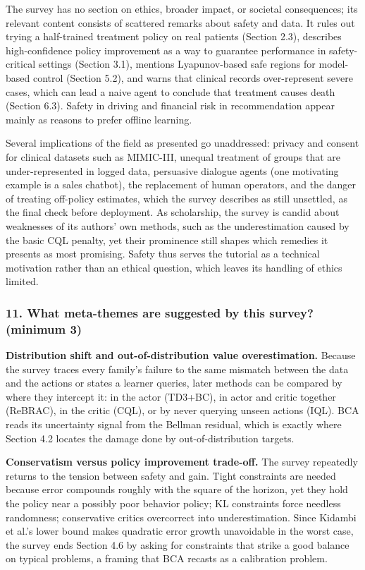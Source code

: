 \documentclass[11pt]{article}
\newcommand{\question}[1]{\subsubsection*{#1}}
\begin{document}
The survey has no section on ethics, broader impact, or societal consequences; its relevant content consists of scattered remarks about safety and data. It rules out trying a half-trained treatment policy on real patients (Section 2.3), describes high-confidence policy improvement as a way to guarantee performance in safety-critical settings (Section 3.1), mentions Lyapunov-based safe regions for model-based control (Section 5.2), and warns that clinical records over-represent severe cases, which can lead a naive agent to conclude that treatment causes death (Section 6.3). Safety in driving and financial risk in recommendation appear mainly as reasons to prefer offline learning.

Several implications of the field as presented go unaddressed: privacy and consent for clinical datasets such as MIMIC-III, unequal treatment of groups that are under-represented in logged data, persuasive dialogue agents (one motivating example is a sales chatbot), the replacement of human operators, and the danger of treating off-policy estimates, which the survey describes as still unsettled, as the final check before deployment. As scholarship, the survey is candid about weaknesses of its authors' own methods, such as the underestimation caused by the basic CQL penalty, yet their prominence still shapes which remedies it presents as most promising. Safety thus serves the tutorial as a technical motivation rather than an ethical question, which leaves its handling of ethics limited.

\question{11. What meta-themes are suggested by this survey? (minimum 3)}

\textbf{Distribution shift and out-of-distribution value overestimation.} Because the survey traces every family's failure to the same mismatch between the data and the actions or states a learner queries, later methods can be compared by where they intercept it: in the actor (TD3+BC), in actor and critic together (ReBRAC), in the critic (CQL), or by never querying unseen actions (IQL). BCA reads its uncertainty signal from the Bellman residual, which is exactly where Section 4.2 locates the damage done by out-of-distribution targets.

\textbf{Conservatism versus policy improvement trade-off.} The survey repeatedly returns to the tension between safety and gain. Tight constraints are needed because error compounds roughly with the square of the horizon, yet they hold the policy near a possibly poor behavior policy; KL constraints force needless randomness; conservative critics overcorrect into underestimation. Since Kidambi et al.'s lower bound makes quadratic error growth unavoidable in the worst case, the survey ends Section 4.6 by asking for constraints that strike a good balance on typical problems, a framing that BCA recasts as a calibration problem.
\end{document}
